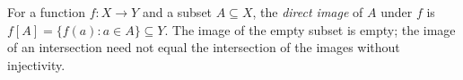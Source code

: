 
For a function $f:X\to Y$ and a subset $A\subseteq X$, the \emph{direct image} of $A$ under $f$ is $f[A]=\{f(a):a\in A\}\subseteq Y$. The image of the empty subset is empty; the image of an intersection need not equal the intersection of the images without injectivity.
